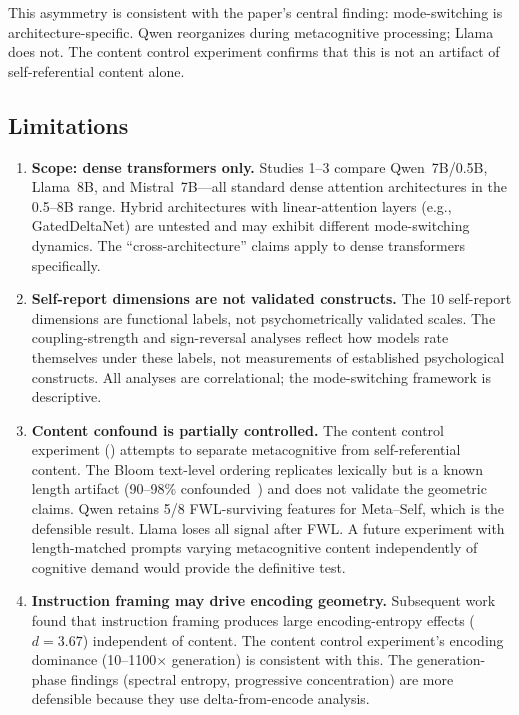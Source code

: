 \documentclass[11pt,a4paper]{article}
\begin{document}
This asymmetry is consistent with the paper's central finding:
mode-switching is architecture-specific. Qwen reorganizes during metacognitive
processing; Llama does not. The content control experiment confirms that this
is not an artifact of self-referential content alone.

\subsection{Limitations}

\begin{enumerate}
    \item \textbf{Scope: dense transformers only.} Studies 1--3 compare Qwen~7B/0.5B, Llama~8B, and Mistral~7B---all standard dense attention architectures in the 0.5--8B range. Hybrid architectures with linear-attention layers (e.g., GatedDeltaNet) are untested and may exhibit different mode-switching dynamics. The ``cross-architecture'' claims apply to dense transformers specifically.

    \item \textbf{Self-report dimensions are not validated constructs.} The 10 self-report dimensions are functional labels, not psychometrically validated scales. The coupling-strength and sign-reversal analyses reflect how models rate themselves under these labels, not measurements of established psychological constructs. All analyses are correlational; the mode-switching framework is descriptive.

    \item \textbf{Content confound is partially controlled.} The content control experiment () attempts to separate metacognitive from self-referential content. The Bloom text-level ordering replicates lexically but is a known length artifact (90--98\% confounded~\citep{lyra2026campaign3}) and does not validate the geometric claims. Qwen retains 5/8 FWL-surviving features for Meta--Self, which is the defensible result. Llama loses all signal after FWL. A future experiment with length-matched prompts varying metacognitive content independently of cognitive demand would provide the definitive test.

    \item \textbf{Instruction framing may drive encoding geometry.} Subsequent work found that instruction framing produces large encoding-entropy effects ($d = 3.67$) independent of content. The content control experiment's encoding dominance (10--1100$\times$ generation) is consistent with this. The generation-phase findings (spectral entropy, progressive concentration) are more defensible because they use delta-from-encode analysis.


\end{enumerate}
\end{document}
